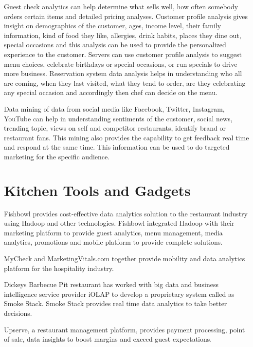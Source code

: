 \documentclass[sigconf]{acmart}
\begin{document}
Guest check analytics can help determine what sells well, how often somebody orders certain items and detailed pricing analyses\cite{www-restaurant}. 
Customer profile analysis gives insight on demographics of the customer, ages, income level, their family information, kind of food they like, allergies, drink habits, places they dine out, special occasions and this analysis can be used to provide the personalized experience to the customer\cite{www-restaurant}. Servers can use customer profile analysis to suggest menu choices, celebrate birthdays or special occasions, or run specials to drive more business. Reservation system data analysis helps in understanding who all are coming, when they last visited, what they tend to order, are they celebrating any special occasion and accordingly then chef can decide on the menu\cite{www-bostonglobe}. 

Data mining of data from social media like Facebook, Twitter, Instagram, YouTube can help in understanding sentiments of the customer, social news, trending topic, views on self and competitor restaurants, identify brand or restaurant fans\cite{JENNINGSLISA2015Mbds}. This mining also provides the capability to get feedback real time and respond at the same time. This information can be used to do targeted marketing for the specific audience\cite{JENNINGSLISA2015Mbds}. 

\section{Kitchen Tools and Gadgets}
Fishbowl provides cost-effective data analytics solution to the restaurant industry using Hadoop and other technologies. Fishbowl integrated Hadoop with their marketing platform to provide guest analytics, menu management, media analytics, promotions and mobile platform to provide complete solutions.\cite{www-foodnewsfeed}\cite{www-fishbowl}  

MyCheck and MarketingVitals.com together provide mobility and data analytics platform for the hospitality industry. \cite{www-buss} 

Dickeys Barbecue Pit restaurant has worked with big data and business intelligence service provider iOLAP to develop a proprietary system called as Smoke Stack. Smoke Stack provides real time data analytics to take better decisions. \cite{www-forbes}

Upserve, a restaurant management platform, provides payment processing, point of sale, data insights to boost margins and exceed guest expectations.\cite{www-bostonglobe}\cite{www-upserve}
\end{document}
